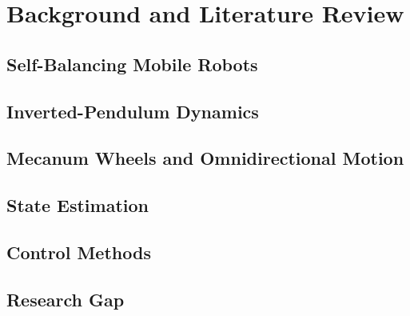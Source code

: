 \chapter{Background and Literature Review}

\section{Self-Balancing Mobile Robots}

\section{Inverted-Pendulum Dynamics}

\section{Mecanum Wheels and Omnidirectional Motion}

\section{State Estimation}

\section{Control Methods}

\section{Research Gap}
